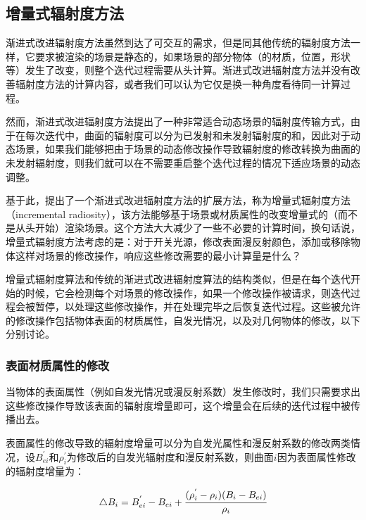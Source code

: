 \subsection{增量式辐射度方法}\label{sec:r-incremental-radiosity}
渐进式改进辐射度方法虽然到达了可交互的需求，但是同其他传统的辐射度方法一样，它要求被渲染的场景是静态的，如果场景的部分物体（的材质，位置，形状等）发生了改变，则整个迭代过程需要从头计算。渐进式改进辐射度方法并没有改善辐射度方法的计算内容，或者我们可以认为它仅是换一种角度看待同一计算过程。

然而，渐进式改进辐射度方法提出了一种非常适合动态场景的辐射度传输方式，由于在每次迭代中，曲面的辐射度可以分为已发射和未发射辐射度的和，因此对于动态场景，如果我们能够把由于场景的动态修改操作导致辐射度的修改转换为曲面的未发射辐射度，则我们就可以在不需要重启整个迭代过程的情况下适应场景的动态调整。

基于此，\cite{a:IncrementalRadiosity:AnExtensionofProgressiveRadiositytoanInteractiveImageSynthesisSystem}提出了一个渐进式改进辐射度方法的扩展方法，称为增量式辐射度方法（incremental radiosity），该方法能够基于场景或材质属性的改变增量式的（而不是从头开始）渲染场景。这个方法大大减少了一些不必要的计算时间，换句话说，增量式辐射度方法考虑的是：对于开关光源，修改表面漫反射颜色，添加或移除物体这样对场景的修改操作，响应这些修改需要的最小计算量是什么？

增量式辐射度算法和传统的渐进式改进辐射度算法的结构类似，但是在每个迭代开始的时候，它会检测每个对场景的修改操作，如果一个修改操作被请求，则迭代过程会被暂停，以处理这些修改操作，并在处理完毕之后恢复迭代过程。这些被允许的修改操作包括物体表面的材质属性，自发光情况，以及对几何物体的修改，以下分别讨论。




\subsubsection{表面材质属性的修改}
当物体的表面属性（例如自发光情况或漫反射系数）发生修改时，我们只需要求出这些修改操作导致该表面的辐射度增量即可，这个增量会在后续的迭代过程中被传播出去。

表面属性的修改导致的辐射度增量可以分为自发光属性和漫反射系数的修改两类情况，设$B^{'}_{ei}$和$\rho^{'}_i$为修改后的自发光辐射度和漫反射系数，则曲面$i$因为表面属性修改的辐射度增量为：

\begin{equation}
	\triangle B_i=B^{'}_{ei}-B_{ei}+ \cfrac{(\rho^{'}_i-\rho_i)(B_i-B_{ei})}{\rho_i}
\end{equation}

